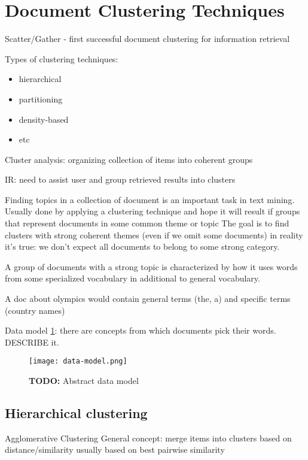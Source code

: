 \section{Document Clustering Techniques}

Scatter/Gather - first successful document clustering for information retrieval \cite{cutting1992scatter}


Types of clustering techniques:
\begin{itemize}
  \item hierarchical
  \item partitioning
  \item density-based
  \item etc
\end{itemize}


Cluster analysis: organizing collection of items into coherent groups

IR: need to assist user and group retrieved results into clusters 


Finding topics in a collection of document is an important task in text mining.
Usually done by applying a clustering technique and hope it will result 
if groups that represent documents in some common theme or topic \cite{ertoz2004finding}
The goal is to find clusters with strong coherent themes (even if we omit some documents)
in reality it's true: we don't expect all documents to belong to some strong category.

A group of documents with a strong topic is characterized by how it uses 
words from some specialized vocabulary in additional to general vocabulary. 

A doc about olympics would contain general terms (the, a) and specific terms (country names)


Data model \cite{ertoz2004finding} \ref{fig:topic-clusters}: there are concepts from which documents pick their words. DESCRIBE it.

\begin{figure}[h]
\centering\texttt{[image: data-model.png]}
\caption{\textbf{TODO: }Abstract data model}
\label{fig:topic-clusters}
\end{figure}


\subsection{Hierarchical clustering}


 Agglomerative Clustering
General concept: merge items into clusters based on distance/similarity
usually based on best pairwise similarity

